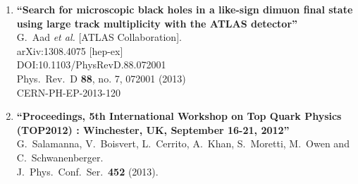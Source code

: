 \documentclass{article}
\begin{document}
\begin{enumerate}
\item%
{\bf ``Search for microscopic black holes in a like-sign dimuon final state using large track multiplicity with the ATLAS detector''}
  \\{}G.~Aad {\it et al.} [ATLAS Collaboration].
  \\{}arXiv:1308.4075 [hep-ex]
  \\{}DOI:10.1103/PhysRevD.88.072001
  \\{}Phys.\ Rev.\ D {\bf 88}, no. 7, 072001 (2013)
  \\{}CERN-PH-EP-2013-120
\item%
{\bf ``Proceedings, 5th International Workshop on Top Quark Physics (TOP2012) : Winchester, UK, September 16-21, 2012''}
  \\{}G.~Salamanna, V.~Boisvert, L.~Cerrito, A.~Khan, S.~Moretti, M.~Owen and C.~Schwanenberger.
  \\{}J.\ Phys.\ Conf.\ Ser.\  {\bf 452} (2013).


\end{enumerate}
\end{document}
